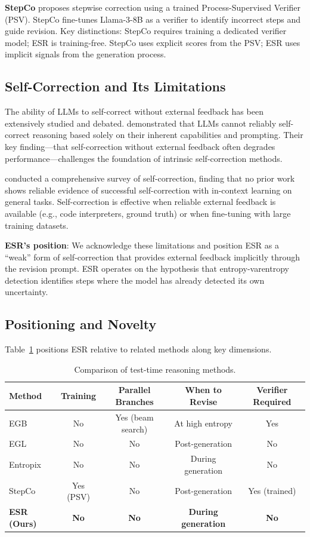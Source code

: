 \documentclass{article}
\begin{document}
\textbf{StepCo} \citep{wu2024stepco} proposes stepwise correction using a trained Process-Supervised Verifier (PSV). StepCo fine-tunes Llama-3-8B as a verifier to identify incorrect steps and guide revision. Key distinctions: StepCo requires training a dedicated verifier model; ESR is training-free. StepCo uses explicit scores from the PSV; ESR uses implicit signals from the generation process.

\subsection{Self-Correction and Its Limitations}

The ability of LLMs to self-correct without external feedback has been extensively studied and debated. \citet{huang2024selfcorrect} demonstrated that LLMs cannot reliably self-correct reasoning based solely on their inherent capabilities and prompting. Their key finding---that self-correction without external feedback often degrades performance---challenges the foundation of intrinsic self-correction methods.

\citet{kamoi2024selfcorrect} conducted a comprehensive survey of self-correction, finding that no prior work shows reliable evidence of successful self-correction with in-context learning on general tasks. Self-correction is effective when reliable external feedback is available (e.g., code interpreters, ground truth) or when fine-tuning with large training datasets.

\textbf{ESR's position}: We acknowledge these limitations and position ESR as a ``weak'' form of self-correction that provides external feedback implicitly through the revision prompt. ESR operates on the hypothesis that entropy-varentropy detection identifies steps where the model has already detected its own uncertainty.

\subsection{Positioning and Novelty}

Table~\ref{tab:comparison} positions ESR relative to related methods along key dimensions.

\begin{table}[t]
\caption{Comparison of test-time reasoning methods.}
\label{tab:comparison}
\centering
\begin{tabular}{lcccc}
\toprule
Method & Training & Parallel Branches & When to Revise & Verifier Required \\
\midrule
EGB \citep{li2025entropy} & No & Yes (beam search) & At high entropy & Yes \\
EGL \citep{correa2025entropy} & No & No & Post-generation & No \\
Entropix \citep{xjdr2024entropix} & No & No & During generation & No \\
StepCo \citep{wu2024stepco} & Yes (PSV) & No & Post-generation & Yes (trained) \\
\textbf{ESR (Ours)} & \textbf{No} & \textbf{No} & \textbf{During generation} & \textbf{No} \\
\bottomrule
\end{tabular}
\end{table}
\end{document}
